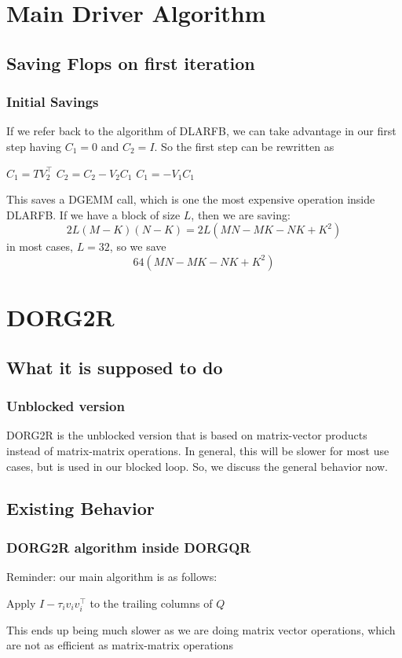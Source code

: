 \documentclass[12pt,aspectratio=169]{beamer}
\begin{document}
    \section{Main Driver Algorithm}
    \subsection{Saving Flops on first iteration}
    \begin{frame}
        \frametitle{Initial Savings}
        If we refer back to the algorithm of DLARFB, we can take advantage in our first step having $C_1 = 0$ and $C_2=I$. So 
        the first step can be rewritten as
        \begin{algorithmic}[1]
            \State $C_1 = TV_2^\top$
            \State $C_2 = C_2 - V_2C_1$
            \State $C_1 =     - V_1C_1$
        \end{algorithmic}
        This saves a DGEMM call, which is one the most expensive operation inside DLARFB. If we have a block of size $L$, then we are saving:
        $$
            2L\left(M-K\right)\left(N-K\right) = 2L\left(MN - MK - NK + K^2\right)
        $$
        in most cases, $L = 32$, so we save
        $$
            64(MN - MK - NK + K^2)
        $$
    \end{frame}
    \section{DORG2R}
    \subsection{What it is supposed to do}
    \begin{frame}
        \frametitle{Unblocked version}
        DORG2R is the unblocked version that is based on matrix-vector products instead of matrix-matrix 
        operations. In general, this will be slower for most use cases, but is used in our blocked loop. So, we discuss the general behavior now.
    \end{frame}
    \subsection{Existing Behavior}
    \begin{frame}
        \frametitle{DORG2R algorithm inside DORGQR}
        Reminder: our main algorithm is as follows:
        \begin{algorithmic}[1]
            \State Apply $I-\tau_iv_iv_i^\top$ to the trailing columns of $Q$
            \EndFor
        \end{algorithmic}
        This ends up being much slower as we are doing matrix vector operations, which are not as
        efficient as matrix-matrix operations
    \end{frame}
\end{document}
